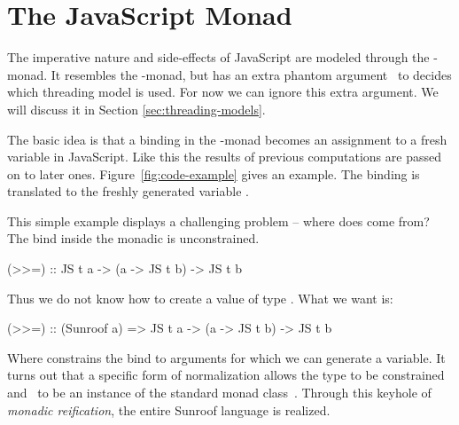  
\section{The JavaScript Monad}
\label{sec:js-monad}

The imperative nature and side-effects of JavaScript are 
modeled through the \JS-monad. It resembles the \IO-monad, 
but has an extra phantom argument~\cite{Leijen:99:Phantom} 
to decides which threading model is used. 
For now we can ignore this extra argument. We will
discuss it in Section \ref{sec:threading-models}.

The basic idea is that a binding in the \JS-monad becomes an
assignment to a fresh variable in JavaScript. Like
this the results of previous computations are passed on to 
later ones.
Figure~\ref{fig:code-example} gives an example.
The binding  is translated to the freshly generated
variable .

This simple example displays a challenging problem -- where does
 come from? The bind inside the monadic  is
unconstrained.
\begin{Code}
(>>=) :: JS t a -> (a -> JS t b) -> JS t b
\end{Code}
Thus we do not know how to create a value of type . What we want is:
\begin{Code}
(>>=) :: (Sunroof a) => JS t a -> (a -> JS t b) -> JS t b
\end{Code}
Where  constrains the bind to
arguments for which we can generate a variable.
It turns out that a specific form of normalization allows 
the type  to be constrained and \JS~to 
be an instance of the standard monad class~\cite{Sculthorpe:13:ConstrainedMonads}.
Through this keyhole of {\em monadic reification},
the entire Sunroof language is realized. 

